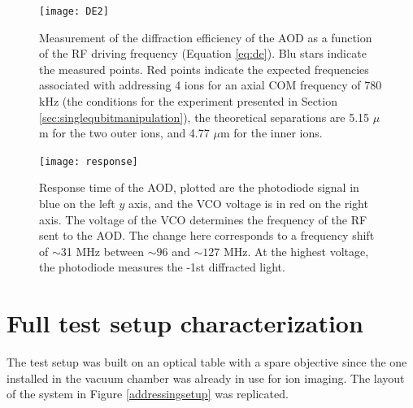 \begin{figure}
\centering
\texttt{[image: DE2]}
\caption{Measurement of the diffraction efficiency of the AOD as a function of the RF driving frequency (Equation \eqref{eq:de}). Blu stars indicate the measured points. Red points indicate the expected frequencies associated with addressing 4 ions for an axial COM frequency of 780 kHz (the conditions for the experiment presented in Section \ref{sec:singlequbitmanipulation}), the theoretical separations are 5.15 $\mu$m for the two outer ions, and 4.77 $\mu$m for the inner ions.}
\label{DE}
\end{figure}

\begin{figure}
\centering
\texttt{[image: response]}
\caption{Response time of the AOD, plotted are the photodiode signal in blue on the left $y$ axis, and the VCO voltage is in red on the right axis. The voltage of the VCO determines the frequency of the RF sent to the AOD. The change here corresponds to a frequency shift of $\sim$31 MHz between $\sim 96$ and $\sim 127$ MHz. At the highest voltage, the photodiode measures the -1st diffracted light.}
\label{response}
\end{figure}

\section{Full test setup characterization}
\label{sec:fullsetup}
The test setup was built on an optical table with a spare objective since the one installed in the vacuum chamber was already in use for ion imaging. The layout of the system in Figure \ref{addressingsetup} was replicated.

